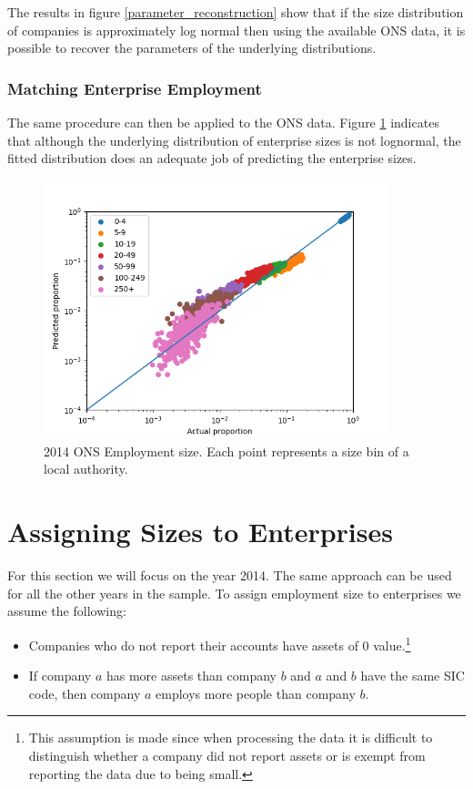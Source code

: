 \documentclass[a4paper,10pt]{article}
\begin{document}
	The results in figure \ref{parameter_reconstruction} show that if the size distribution of companies is approximately log normal then using the available ONS data, it is possible to recover the parameters of the underlying distributions.

   \subsubsection{Matching Enterprise Employment}
   \label{enterprise_employment}
   The same procedure can then be applied to the ONS data. Figure \ref{2014_size_dist_results} indicates that although the underlying distribution of enterprise sizes is not lognormal, the fitted distribution does an adequate job of predicting the enterprise sizes.

   \begin{figure}[!ht]
      \begin{center}
         \caption{2014 ONS Employment size. Each point represents a size bin of a local authority.}
         \label{2014_size_dist_results}
         \includegraphics[width=10cm]{graphs/2014_enterprise_size_by_la}
      \end{center}
   \end{figure}


   \label{enterprise_employment}
   \section{Assigning Sizes to Enterprises}
   \label{assigning_sizes}
   For this section we will focus on the year 2014. The same approach can be used for all the other years in the sample. To assign employment size to enterprises we assume the following:
   \begin{itemize}
      \item Companies who do not report their accounts have assets of 0 value.\footnote{This assumption is made since when processing the data it is difficult to distinguish whether a company did not report assets or is exempt from reporting the data due to being small.}
      \item If company $a$ has more assets than company $b$ and $a$ and $b$ have the same SIC code, then company $a$ employs more people than company $b$.
   \end{itemize}
\end{document}
